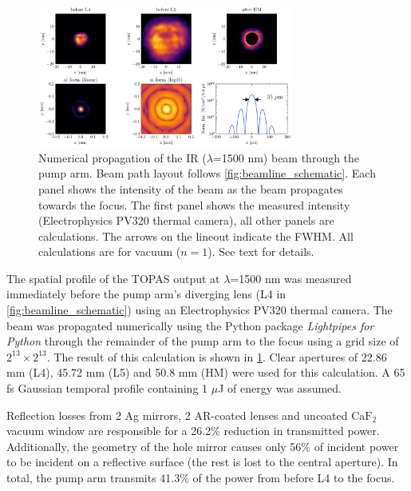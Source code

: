 \begin{figure}
	\centering
	\includegraphics[width=0.75\textwidth]{figures/chap2/pump_on_focus_calculation_8192_inferno.pdf}
	\caption{Numerical propagation of the IR ($\lambda$=1500 nm) beam through the pump arm. Beam path layout follows \cref{fig:beamline_schematic}. Each panel shows the intensity of the beam as the beam propagates towards the focus. The first panel shows the measured intensity (Electrophysics PV320 thermal camera), all other panels are calculations. The arrows on the lineout indicate the FWHM. All calculations are for vacuum ($n=1$). See text for details.}
	\label{fig:pump_on_focus_calculation}
\end{figure}

The spatial profile of the TOPAS output at $\lambda$=1500 nm was measured immediately before the pump arm's diverging lens (L4 in \cref{fig:beamline_schematic}) using an Electrophysics PV320 thermal camera. The beam was propagated numerically using the Python package \textit{Lightpipes for Python} \cite{vdovinLightPipesPython} through the remainder of the pump arm to the focus using a grid size of $2^{13}\times2^{13}$. The result of this calculation is shown in \cref{fig:pump_on_focus_calculation}. Clear apertures of 22.86 mm (L4), 45.72 mm (L5) and 50.8 mm (HM) were used for this calculation. A 65 fs Gaussian temporal profile containing 1 $\mu$J of energy was assumed.

Reflection losses from 2 Ag mirrors, 2 AR-coated lenses and uncoated $\text{CaF}_2$ vacuum window are responsible for a 26.2\% reduction in transmitted power. Additionally, the geometry of the hole mirror causes only 56\% of incident power to be incident on a reflective surface (the rest is lost to the central aperture). In total, the pump arm transmits 41.3\% of the power from before L4 to the focus.

